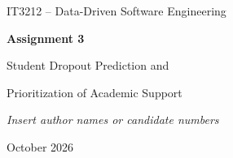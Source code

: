 \begin{titlepage}
    \centering
    \vspace*{2cm}

    {\Large IT3212 -- Data-Driven Software Engineering\par}
    \vspace{1cm}
    {\huge\bfseries Assignment 3\par}
    \vspace{0.6cm}
    {\LARGE Student Dropout Prediction and\par
    Prioritization of Academic Support\par}

    \vspace{2cm}
    {\large\itshape Insert author names or candidate numbers\par}

    \vfill
    {\large October 2026\par}
\end{titlepage}
